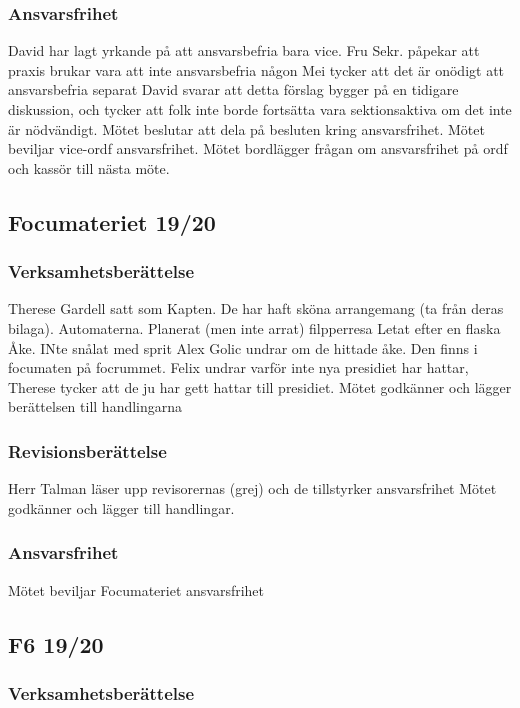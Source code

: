 \documentclass[hidelinks]{sektionsmote}
\begin{document}
\subsubsection{Ansvarsfrihet}
David har lagt yrkande på att ansvarsbefria bara vice.
Fru Sekr. påpekar att praxis brukar vara att inte ansvarsbefria någon
Mei tycker att det är onödigt att ansvarsbefria separat
David svarar att detta förslag bygger på en tidigare diskussion, och tycker att folk inte borde fortsätta vara sektionsaktiva om det inte är nödvändigt.
Mötet beslutar att dela på besluten kring ansvarsfrihet.
Mötet beviljar vice-ordf ansvarsfrihet.
Mötet bordlägger frågan om ansvarsfrihet på ordf och kassör till nästa möte.

\subsection{Focumateriet 19/20}

\subsubsection{Verksamhetsberättelse}
Therese Gardell satt som Kapten.
De har haft sköna arrangemang (ta från deras bilaga).
Automaterna.
Planerat (men inte arrat) filpperresa
Letat efter en flaska Åke.
INte snålat med sprit
Alex Golic undrar om de hittade åke. Den finns i focumaten på focrummet.
Felix undrar varför inte nya presidiet har hattar, Therese tycker att de ju har gett hattar till presidiet.
Mötet godkänner och lägger berättelsen till handlingarna

\subsubsection{Revisionsberättelse}
Herr Talman läser upp revisorernas (grej) och de tillstyrker ansvarsfrihet
Mötet godkänner och lägger till handlingar.

\subsubsection{Ansvarsfrihet}
Mötet beviljar Focumateriet ansvarsfrihet

\subsection{F6 19/20}

\subsubsection{Verksamhetsberättelse}
\end{document}

